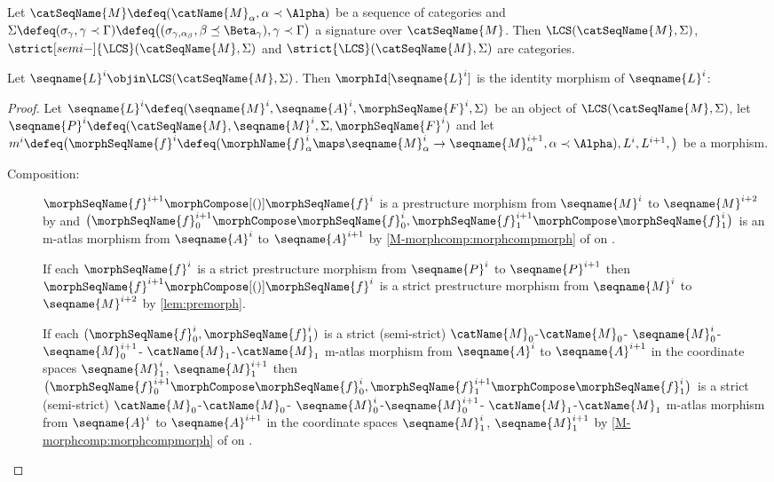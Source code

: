 \documentclass{article}
\begin{document}
\begin{theorem}
\label{the:LCSiscat}
Let $\catSeqName{M} \defeq (\catName{M}_\alpha, \alpha \prec \Alpha)$
be a sequence of categories and
$
\Sigma \defeq
(\sigma_\gamma, \gamma \prec \Gamma) \defeq
\bigl (
  (
    \sigma_{\gamma,{\alpha_\beta}}, \beta \preceq \Beta_\gamma
  ),
\gamma \prec \Gamma
\bigr )
$
a signature over $\catSeqName{M}$. Then
$\LCS(\catSeqName{M}, \Sigma)$,
$\strict[semi-]{\LCS}(\catSeqName{M}, \Sigma)$ and
$\strict{\LCS}(\catSeqName{M}, \Sigma)$ are categories.

Let $\seqname{L}^i \objin \LCS(\catSeqName{M}, \Sigma)$.
Then $\morphId[{\seqname{L}^i}]$ is the identity morphism of $\seqname{L}^i$:

\begin{proof}
Let
$
  \seqname{L}^i
  \defeq
  (
    \seqname{M}^i,
    \seqname{A}^i,
    \morphSeqName{F}^i,
    \Sigma
  )
$
be an object of $\LCS(\catSeqName{M}, \Sigma)$, let
$
  \seqname{P}^i \defeq \\
  (
    \catSeqName{M},
    \seqname{M}^i,
    \Sigma,
    \morphSeqName{F}^i
  )
$
and let
$
  m^i \defeq
  \bigl (
    \morphSeqName{f}^i \defeq (\morphName{f}^i_\alpha \maps
    \seqname{M}^i_\alpha \to \seqname{M}^{i+1}_\alpha,
    \alpha \prec \Alpha),
    L^i,
    L^{i+1},
  \bigr )
$
be a morphism.
\begin{description}
\item[Composition:]
$\morphSeqName{f}^{i+1} \morphCompose[()] \morphSeqName{f}^i$ is a
prestructure morphism from $\seqname{M}^i$ to $\seqname{M}^{i+2}$
by 
and
$
\bigl (
  \morphSeqName{f}^{i+1}_0 \morphCompose \morphSeqName{f}^i_0,
  \morphSeqName{f}^{i+1}_1 \morphCompose \morphSeqName{f}^i_1
\bigr )
$
is an m-atlas morphism from $\seqname{A}^i$ to $\seqname{A}^{i+1}$ by
\cref{M-morphcomp:morphcompmorph} of
{
  \showlabelsinline
   on
  .
}

If each $\morphSeqName{f}^i$ is a strict prestructure morphism from
$\seqname{P}^i$ to $\seqname{P}^{i+1}$ then
$\morphSeqName{f}^{i+1} \morphCompose[()] \morphSeqName{f}^i$ is a strict
prestructure morphism from $\seqname{M}^i$ to $\seqname{M}^{i+2}$
by \cref{lem:premorph}.

If each $(\morphSeqName{f}^i_0, \morphSeqName{f}^i_1)$ is a strict (semi-strict)
$\catName{M}_0$-$\catName{M}_0$-%
$\seqname{M}^i_0$-$\seqname{M}^{i+1}_0$-%
$\catName{M}_1$-$\catName{M}_1$
m-atlas morphism from $\seqname{A}^i$ to $\seqname{A}^{i+1}$ in the
coordinate spaces $\seqname{M}^i_1$, $\seqname{M}^{i+1}_1$ then
$
\bigl (
  \morphSeqName{f}^{i+1}_0 \morphCompose \morphSeqName{f}^i_0,
  \morphSeqName{f}^{i+1}_1 \morphCompose \morphSeqName{f}^i_1
\bigr )
$
is a strict (semi-strict)
$\catName{M}_0$-$\catName{M}_0$-%
$\seqname{M}^i_0$-$\seqname{M}^{i+1}_0$-%
$\catName{M}_1$-$\catName{M}_1$
m-atlas morphism from $\seqname{A}^i$ to $\seqname{A}^{i+1}$ in the
coordinate spaces $\seqname{M}^i_1$, $\seqname{M}^{i+1}_1$ by
\cref{M-morphcomp:morphcompmorph} of
{
  \showlabelsinline
   on
  .
}


\end{description}
\end{proof}
\end{theorem}
\end{document}

